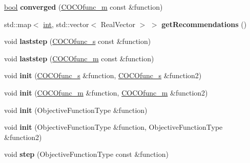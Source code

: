 \begin{DoxyCompactItemize}
\item 
\hyperlink{classbool}{bool} {\bfseries converged} (\hyperlink{classCOCOfunc__m}{C\+O\+C\+Ofunc\+\_\+m} const \&function)\hypertarget{classSAPEO_add24e847e757da23bd0a000ce9a7007b}{}\label{classSAPEO_add24e847e757da23bd0a000ce9a7007b}

\item 
std\+::map$<$ \hyperlink{classint}{int}, std\+::vector$<$ Real\+Vector $>$ $>$ {\bfseries get\+Recommendations} ()\hypertarget{classSAPEO_aa46019e87f390034ea6a2d504966a7c0}{}\label{classSAPEO_aa46019e87f390034ea6a2d504966a7c0}

\item 
void {\bfseries laststep} (\hyperlink{classCOCOfunc__s}{C\+O\+C\+Ofunc\+\_\+s} const \&function)\hypertarget{classSAPEO_ad080f0dae7e77cfaa2bbb8c558e9e422}{}\label{classSAPEO_ad080f0dae7e77cfaa2bbb8c558e9e422}

\item 
void {\bfseries laststep} (\hyperlink{classCOCOfunc__m}{C\+O\+C\+Ofunc\+\_\+m} const \&function)\hypertarget{classSAPEO_af7fe550d79a902ac68e7af144995fedb}{}\label{classSAPEO_af7fe550d79a902ac68e7af144995fedb}

\item 
void {\bfseries init} (\hyperlink{classCOCOfunc__s}{C\+O\+C\+Ofunc\+\_\+s} \&function, \hyperlink{classCOCOfunc__s}{C\+O\+C\+Ofunc\+\_\+s} \&function2)\hypertarget{classSAPEO_a75aacea08d557592479dce66aadb17b7}{}\label{classSAPEO_a75aacea08d557592479dce66aadb17b7}

\item 
void {\bfseries init} (\hyperlink{classCOCOfunc__m}{C\+O\+C\+Ofunc\+\_\+m} \&function, \hyperlink{classCOCOfunc__m}{C\+O\+C\+Ofunc\+\_\+m} \&function2)\hypertarget{classSAPEO_af65cbfeacd5cbf3860a81f8d45c891d5}{}\label{classSAPEO_af65cbfeacd5cbf3860a81f8d45c891d5}

\item 
void {\bfseries init} (Objective\+Function\+Type \&function)\hypertarget{classCocoOptimiser_a0c7df5618e3fba607b32cf77190f49cb}{}\label{classCocoOptimiser_a0c7df5618e3fba607b32cf77190f49cb}

\item 
void {\bfseries init} (Objective\+Function\+Type \&function, Objective\+Function\+Type \&function2)\hypertarget{classCocoOptimiser_af261a238b756aeda91f891ca417ebe58}{}\label{classCocoOptimiser_af261a238b756aeda91f891ca417ebe58}

\item 
void {\bfseries step} (Objective\+Function\+Type const \&function)\hypertarget{classCocoOptimiser_ae48180f04b5b40318b4c52cd02862239}{}\label{classCocoOptimiser_ae48180f04b5b40318b4c52cd02862239}


\end{DoxyCompactItemize}
